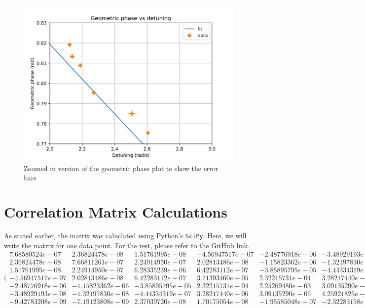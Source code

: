 \begin{figure}[H]
	\centering
	\includegraphics[scale=0.4]{Zoomed_in_geometric_phase.png}
	\caption{Zoomed in version of the geometric phase plot to show the error bars}
	\label{fig:first_sq}
\end{figure}

\section{Correlation Matrix Calculations}
As stated earlier, the matrix was caluclated using Python's \texttt{SciPy}. Here, we will write the matrix for one data point. For the rest, please refer to the GitHub link.
$
\Bigg(\begin{smallmatrix}
	7.68580524e-07 & 2.36824478e-08 & 1.51761995e-08 & -4.56947517e-07
	& -2.48776918e-06 & -3.48929193e-08 & -9.42783208e-09 \\
	2.36824478e-08 & 7.66811261e-07 & 2.24914950e-07 & 2.02813486e-08
	&-1.15823362e-06& -1.32197830e-08& -7.19123808e-09 \\
	 1.51761995e-08&  2.24914950e-07&  6.28335239e-06 & 6.42283112e-07
	&-3.85895795e-05 &-4.44334319e-07&  2.37039720e-08 \\
	-4.56947517e-07 & 2.02813486e-08&  6.42283112e-07 & 3.71393460e-05
	&2.32215731e-04 & 3.28217440e-06&  1.70175054e-08 \\
	-2.48776918e-06& -1.15823362e-06& -3.85895795e-05&  2.32215731e-04
	&2.25269480e-03 & 3.09135290e-05& -1.95585048e-07 \\
	-3.48929193e-08& -1.32197830e-08& -4.44334319e-07 & 3.28217440e-06
	&3.09135290e-05 & 4.25921825e-07 &-2.32283158e-09 \\
	-9.42783208e-09& -7.19123808e-09&  2.37039720e-08&  1.70175054e-08
	&-1.95585048e-07 &-2.32283158e-09 & 3.78885897e-07
\end{smallmatrix}\Bigg)
$
\setcounter{equation}{0}
\setcounter{table}{0}
\setcounter{figure}{0}
